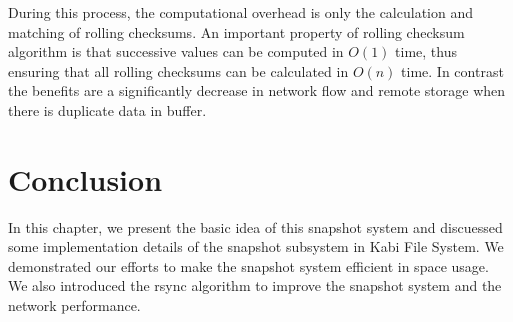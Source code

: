     During this process, the computational overhead is only the calculation and matching of rolling checksums. An important property of rolling checksum algorithm is that successive values can be computed in $O(1)$ time, thus ensuring that all rolling checksums can be calculated in $O(n)$ time. In contrast the benefits are a significantly decrease in network flow and remote storage when there is duplicate data in buffer.

\section{Conclusion}

   In this chapter, we present the basic idea of this snapshot system and discuessed some implementation details of the snapshot subsystem in Kabi File System. We demonstrated our efforts to make the snapshot system efficient in space usage. We also introduced the rsync algorithm to improve the snapshot system and the network performance.
